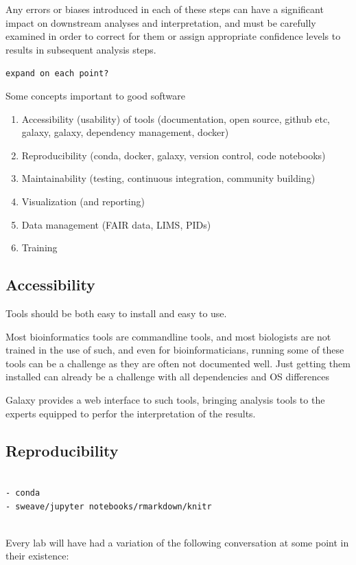 Any errors or biases introduced in each of these steps can have a significant impact on downstream analyses and interpretation, and must be carefully examined in order to correct for them or assign appropriate confidence levels to results in subsequent analysis steps.

\verb+expand on each point?+

Some concepts important to good software

\begin{enumerate}
\item Accessibility (usability) of tools (documentation, open source, github etc, galaxy, galaxy, dependency management, docker)
\item Reproducibility (conda, docker, galaxy, version control, code notebooks)
\item Maintainability (testing, continuous integration, community building)
\item Visualization (and reporting)
\item Data management (FAIR data, LIMS, PIDs)
\item Training
\end{enumerate}


\subsection{Accessibility}
Tools should be both easy to install and easy to use.

Most bioinformatics tools are commandline tools, and most biologists are not trained in the use of such, and even for bioinformaticians, running some of these tools can be a challenge as they are often not documented well. Just getting them installed can already be a challenge with all dependencies and OS differences

Galaxy \cite{afgan2016galaxy} provides a web interface to such tools, bringing analysis tools to the experts equipped to perfor the interpretation of the results.


\subsection{Reproducibility}
\begin{verbatim}

- conda
- sweave/jupyter notebooks/rmarkdown/knitr


\end{verbatim}
Every lab will have had a variation of the following conversation at some point in their existence:

